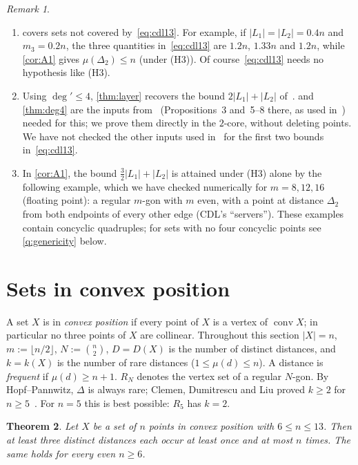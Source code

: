 \documentclass[11pt]{amsart}
\newtheorem{theorem}{Theorem}[section]
\theoremstyle{definition}
\theoremstyle{remark}
\newtheorem{remark}[theorem]{Remark}
\newcommand{\Dt}{\Delta_2}
\newcommand{\mult}{\mu}
\newcommand{\conv}{\operatorname{conv}}
\begin{document}
\begin{remark}\label{rem:layers}
\begin{enumerate}[leftmargin=2em,label=(\alph*)]
\item {} covers sets not covered by~\eqref{eq:cdl13}. For example, if $|L_1|=|L_2|=0.4n$ and $m_3=0.2n$, the three quantities in~\eqref{eq:cdl13} are $1.2n$, $1.33n$ and $1.2n$, while \cref{cor:A1} gives $\mult(\Dt)\le n$ (under (H3)). Of course~\eqref{eq:cdl13} needs no hypothesis like (H3).
\item Using $\deg'\le4$, \cref{thm:layer} recovers the bound $2|L_1|+|L_2|$ of~\cite[Theorem~1.3]{CDL25}.  and \cref{thm:deg4} are the inputs from~\cite{Ve96} (Propositions~3 and~5--8 there, as used in~\cite{CDL25}) needed for this; we prove them directly in the $2$-core, without deleting points. We have not checked the other inputs used in~\cite{CDL25} for the first two bounds in~\eqref{eq:cdl13}.
\item In \cref{cor:A1}, the bound $\frac32|L_1|+|L_2|$ is attained under (H3) alone by the following example, which we have checked numerically for $m=8,12,16$ (floating point): a regular $m$-gon with $m$ even, with a point at distance $\Dt$ from both endpoints of every other edge (CDL's ``servers''). These examples contain concyclic quadruples; for sets with no four concyclic points see \cref{q:genericity} below.
\end{enumerate}
\end{remark}

\section{Sets in convex position}\label{sec:convex}

A set $X$ is in \emph{convex position} if every point of $X$ is a vertex of $\conv X$; in particular no three points of $X$ are collinear. Throughout this section $|X|=n$, $m:=\lfloor n/2\rfloor$, $N:=\binom n2$, $D=D(X)$ is the number of distinct distances, and $k=k(X)$ is the number of rare distances ($1\le\mult(d)\le n$). A distance is \emph{frequent} if $\mult(d)\ge n+1$. $R_N$ denotes the vertex set of a regular $N$-gon. By Hopf--Pannwitz, $\Delta$ is always rare; Clemen, Dumitrescu and Liu proved $k\ge2$ for $n\ge5$~\cite[Theorem~1.2]{CDL25}. For $n=5$ this is best possible: $R_5$ has $k=2$.

\begin{theorem}\label{thm:convex-summary}
Let $X$ be a set of $n$ points in convex position with $6\le n\le13$. Then at least three distinct distances each occur at least once and at most $n$ times. The same holds for every even $n\ge6$.
\end{theorem}
\end{document}

